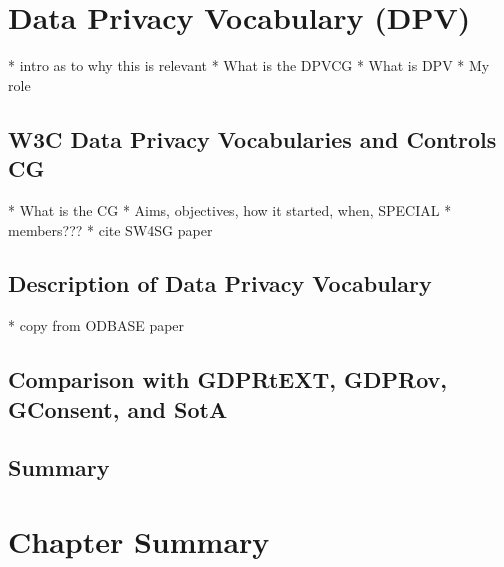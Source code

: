 \section{Data Privacy Vocabulary (DPV)}\label{sec:voc:DPV}

* intro as to why this is relevant
* What is the DPVCG
* What is DPV
* My role

\subsection{W3C Data Privacy Vocabularies and Controls CG}
* What is the CG
* Aims, objectives, how it started, when, SPECIAL
* members???
* cite SW4SG paper

\subsection{Description of Data Privacy Vocabulary}
* copy from ODBASE paper

\subsection{Comparison with GDPRtEXT, GDPRov, GConsent, and SotA}

\subsection*{Summary}

\section{Chapter Summary}